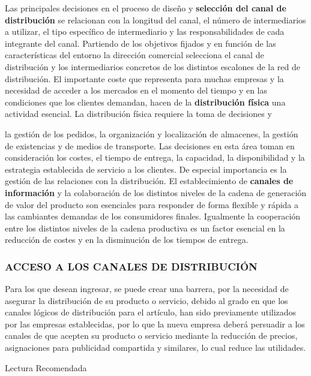 Las principales decisiones en el proceso de diseño y \textbf{selección del canal de distribución }se relacionan con la longitud del canal, el número de intermediarios a utilizar, el tipo específico de intermediario y las responsabilidades de cada integrante del canal. Partiendo de los objetivos fijados y en función de las características del entorno la dirección comercial selecciona el canal de distribución y los intermediarios concretos de los distintos escalones de la red de distribución. El importante coste que representa para muchas empresas y la necesidad de acceder a los mercados en el momento del tiempo y en las condiciones que los clientes demandan, hacen de la \textbf{distribución física }una actividad esencial. La distribución física requiere la toma de decisiones y



la gestión de los pedidos, la organización y localización de almacenes, la gestión de existencias y de medios de transporte. Las decisiones en esta área toman en consideración los costes, el tiempo de entrega, la capacidad, la disponibilidad y la estrategia establecida de servicio a los clientes. De especial importancia es la gestión de las relaciones con la distribución. El establecimiento de \textbf{canales de información }y la colaboración de los distintos niveles de la cadena de generación de valor del producto son esenciales para responder de forma flexible y rápida a las cambiantes demandas de los consumidores finales. Igualmente la cooperación entre los distintos niveles de la cadena productiva es un factor esencial en la reducción de costes y en la disminución de los tiempos de entrega.

\subsubsection*{ACCESO A LOS CANALES DE DISTRIBUCIÓN}
Para los que desean ingresar, se puede crear una barrera, por la necesidad de asegurar la distribución de su producto o servicio, debido al grado en que los canales lógicos de distribución para el artículo, han sido previamente utilizados por las empresas establecidas, por lo que la nueva empresa deberá persuadir a los canales de que acepten su producto o servicio mediante la reducción de precios, asignaciones para publicidad compartida y similares, lo cual reduce las utilidades.

Lectura Recomendada



